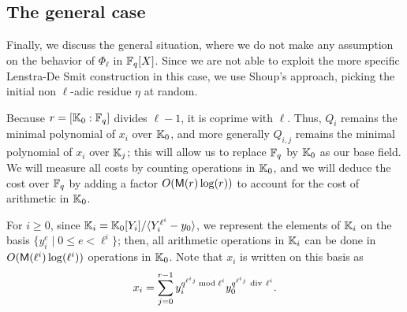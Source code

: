 \documentclass{sig-alternate}
\begin{document}



\subsection{The general case}

Finally, we discuss the general situation, where we do not make any
assumption on the behavior of $\Phi_\ell$ in $\mathbb{F}_q[X]$.  Since we are
not able to exploit the more specific Lenstra-De Smit construction in
this case, we use Shoup's approach, picking the initial non
$\ell$-adic residue $\eta$ at random.

Because $r=[\mathbb{K}_0 : \mathbb{F}_q]$ divides $\ell-1$, it is coprime with
$\ell$. Thus, $Q_i$ remains the minimal polynomial of $x_i$ over
$\mathbb{K}_0$, and more generally $Q_{i,j}$ remains the minimal polynomial of
$x_i$ over $\mathbb{K}_{j}$; this will allow us to replace $\mathbb{F}_q$ by $\mathbb{K}_0$ as
our base field. We will measure all costs by counting operations in
$\mathbb{K}_0$, and we will deduce the cost over $\mathbb{F}_q$ by adding a factor
$O(\mathsf{M}(r)\log(r))$ to account for the cost of arithmetic in $\mathbb{K}_0$.

For $i \ge 0$, since $\mathbb{K}_i=\mathbb{K}_0[Y_i]/\langle Y_i^{\ell^i}-y_0\rangle$,
we represent the elements of $\mathbb{K}_i$ on the basis $\{y_i^e \mid 0 \le e
< \ell^i\}$; then, all arithmetic operations in $\mathbb{K}_i$ can be done in
$O(\mathsf{M}(\ell^i)\log(\ell^i))$ operations in $\mathbb{K}_0$. Note that $x_i$
is written on this basis as
\begin{equation}\label{eq-def:xiyi}
x_i = \sum_{j = 0}^{r-1} y_i^{q^{\ell^i j} \bmod \ell^i}
y_0^{q^{\ell^i j} {\rm~div~} \ell^i}. 
\end{equation}
\end{document}
